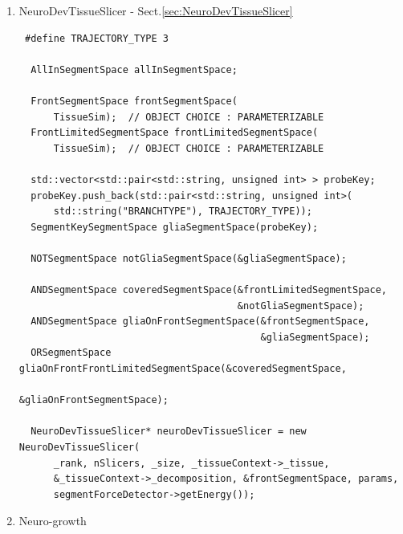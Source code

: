 \begin{enumerate}
\begin{verbatim}
\end{verbatim}

  \item NeuroDevTissueSlicer - Sect.\ref{sec:NeuroDevTissueSlicer}
  
  
\begin{verbatim}
 #define TRAJECTORY_TYPE 3
 
  AllInSegmentSpace allInSegmentSpace;

  FrontSegmentSpace frontSegmentSpace(
      TissueSim);  // OBJECT CHOICE : PARAMETERIZABLE
  FrontLimitedSegmentSpace frontLimitedSegmentSpace(
      TissueSim);  // OBJECT CHOICE : PARAMETERIZABLE

  std::vector<std::pair<std::string, unsigned int> > probeKey;
  probeKey.push_back(std::pair<std::string, unsigned int>(
      std::string("BRANCHTYPE"), TRAJECTORY_TYPE));
  SegmentKeySegmentSpace gliaSegmentSpace(probeKey);
 
  NOTSegmentSpace notGliaSegmentSpace(&gliaSegmentSpace);

  ANDSegmentSpace coveredSegmentSpace(&frontLimitedSegmentSpace,
                                      &notGliaSegmentSpace);
  ANDSegmentSpace gliaOnFrontSegmentSpace(&frontSegmentSpace,
                                          &gliaSegmentSpace);
  ORSegmentSpace gliaOnFrontFrontLimitedSegmentSpace(&coveredSegmentSpace,
                                                     &gliaOnFrontSegmentSpace);

  NeuroDevTissueSlicer* neuroDevTissueSlicer = new NeuroDevTissueSlicer(
      _rank, nSlicers, _size, _tissueContext->_tissue,
      &_tissueContext->_decomposition, &frontSegmentSpace, params,
      segmentForceDetector->getEnergy());
\end{verbatim}

  \item Neuro-growth
  

\end{enumerate}
